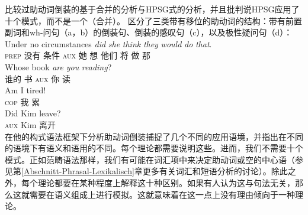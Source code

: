 \citet{Chomsky2010a}比较过助动词倒装的基于合并的分析与HPSG式的分析，并且批判说HPSG应用了十个模式，而不是一个（合并）。 \citet{GSag2000a-u}区分了三类带有移位的助动词的结构：带有前置副词和wh-问句（a，b）的倒装句、倒装的感叹句（c），以及极性疑问句（d）：
\eal
\ex 
\gll Under no circumstances \emph{did} \emph{she} \emph{think} \emph{they} \emph{would} \emph{do} \emph{that}.\\
     \textsc{prep} 没有 条件 \textsc{aux} 她 想 他们 将 做 那\\
\ex 
\gll Whose book \emph{are} \emph{you} \emph{reading}?\\
谁的 书 \textsc{aux} 你 读\\
\ex 
\gll Am I tired!\\
\textsc{cop} 我 累\\
\ex 
\gll Did Kim leave?\\
\textsc{aux} Kim 离开\\
\zl
 \citet{Fillmore99a}在他的构式语法\indexcxg 框架下分析助动词倒装捕捉了几个不同的应用语境，并指出在不同的语境下有语义和语用的不同。每个理论都需要说明这些。进而，我们不需要十个模式。正如范畴语法那样，我们有可能在词汇项中来决定助动词或空的中心语（参见第\ref{Abschnitt-Phrasal-Lexikalisch}章更多有关词汇和短语分析的讨论）。除此之外，每个理论都要在某种程度上解释这十种区别。如果有人认为这与句法无关，那么这就需要在语义组成上进行模拟。这就意味着在这一点上没有理由倾向于一种理论。


